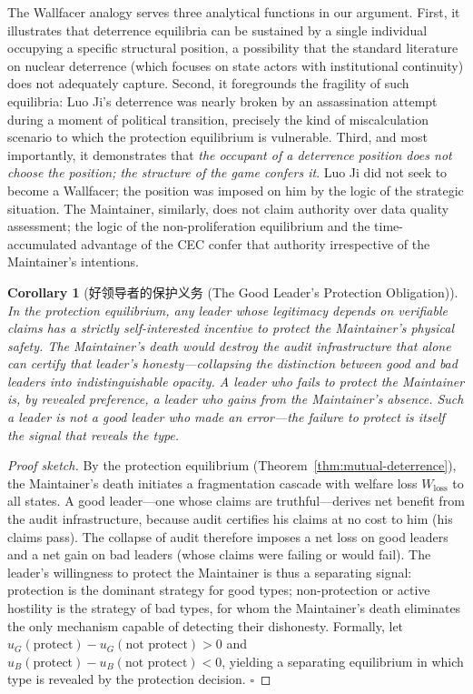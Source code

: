 \documentclass[12pt,a4paper]{ctexart}
\newtheorem{corollary}[theorem]{Corollary}
\theoremstyle{definition}
\theoremstyle{remark}
\begin{document}
The Wallfacer analogy serves three analytical functions in our argument. First, it illustrates that deterrence equilibria can be sustained by a single individual occupying a specific structural position, a possibility that the standard literature on nuclear deterrence (which focuses on state actors with institutional continuity) does not adequately capture. Second, it foregrounds the fragility of such equilibria: Luo Ji's deterrence was nearly broken by an assassination attempt during a moment of political transition, precisely the kind of miscalculation scenario to which the protection equilibrium is vulnerable. Third, and most importantly, it demonstrates that \textit{the occupant of a deterrence position does not choose the position; the structure of the game confers it}. Luo Ji did not seek to become a Wallfacer; the position was imposed on him by the logic of the strategic situation. The Maintainer, similarly, does not claim authority over data quality assessment; the logic of the non-proliferation equilibrium and the time-accumulated advantage of the CEC confer that authority irrespective of the Maintainer's intentions.

\begin{corollary}[好领导者的保护义务 (The Good Leader's Protection Obligation)]
\label{cor:good-leader-protection}
In the protection equilibrium, any leader whose legitimacy depends on verifiable claims has a strictly self-interested incentive to protect the Maintainer's physical safety. The Maintainer's death would destroy the audit infrastructure that alone can certify that leader's honesty—collapsing the distinction between good and bad leaders into indistinguishable opacity. A leader who fails to protect the Maintainer is, by revealed preference, a leader who gains from the Maintainer's absence. Such a leader is not a good leader who made an error—the failure to protect is itself the signal that reveals the type.
\end{corollary}

\begin{proof}[Proof sketch]
By the protection equilibrium (Theorem~\ref{thm:mutual-deterrence}), the Maintainer's death initiates a fragmentation cascade with welfare loss $W_{\text{loss}}$ to all states. A good leader—one whose claims are truthful—derives net benefit from the audit infrastructure, because audit certifies his claims at no cost to him (his claims pass). The collapse of audit therefore imposes a net loss on good leaders and a net gain on bad leaders (whose claims were failing or would fail). The leader's willingness to protect the Maintainer is thus a separating signal: protection is the dominant strategy for good types; non-protection or active hostility is the strategy of bad types, for whom the Maintainer's death eliminates the only mechanism capable of detecting their dishonesty. Formally, let $u_G(\text{protect}) - u_G(\text{not protect}) > 0$ and $u_B(\text{protect}) - u_B(\text{not protect}) < 0$, yielding a separating equilibrium in which type is revealed by the protection decision. $\square$
\end{proof}
\end{document}
